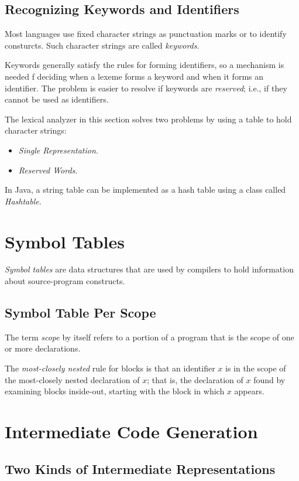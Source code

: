 \documentclass[a4paper,twoside]{book}
\begin{document}
\subsection{Recognizing Keywords and Identifiers}

Most languages use fixed character strings as punctuation marks or to identify consturcts. Such character strings are called \textit{keywords}.

Keywords generally satisfy the rules for forming identifiers, so a mechanism is needed f deciding when a lexeme forms a keyword and when it forms an identifier. The problem is easier to resolve if keywords are \textit{reserved}; i.e., if they cannot be used as identifiers.

The lexical analyzer in this section solves two problems by using a table to hold character strings:
\begin{itemize}
    \item\textit{Single Representation.}
    \item\textit{Reserved Words}.
\end{itemize}

In Java, a string table can be implemented as a hash table using a class called \textit{Hashtable}.

\section{Symbol Tables}

\textit{Symbol tables} are data structures that are used by compilers to hold information about source-program constructs.

\subsection{Symbol Table Per Scope}

The term \textit{scope} by itself refers to a portion of a program that is the scope of one or more declarations.

The \textit{most-closely nested} rule for blocks is that an identifier $x$ is in the scope of the most-closely nested declaration of $x$; that is, the declaration of $x$ found by examining blocks inside-out, starting with the block in which $x$ appears.

\section{Intermediate Code Generation}
\subsection{Two Kinds of Intermediate Representations}
\end{document}
